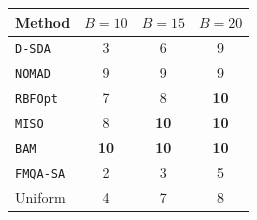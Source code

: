 \begin{tabular}{@{}lccc@{}}\toprule
Method & \(B=10\) & \(B=15\) & \(B=20\)\\\midrule
\texttt{D-SDA} & 3 & 6 & 9 \\
\texttt{NOMAD} & 9 & 9 & 9 \\
\texttt{RBFOpt} & 7 & 8 & \textbf{10} \\
\texttt{MISO} & 8 & \textbf{10} & \textbf{10} \\
\texttt{BAM} & \textbf{10} & \textbf{10} & \textbf{10} \\
\texttt{FMQA-SA} & 2 & 3 & 5 \\
Uniform & 4 & 7 & 8 \\
\bottomrule\end{tabular}
